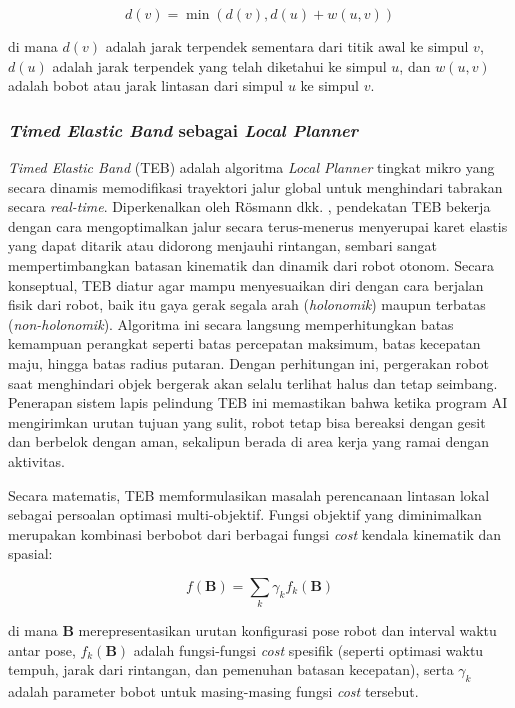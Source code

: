 \begin{equation}
d(v) = \min(d(v), d(u) + w(u, v))
\label{eq:dijkstra}
\end{equation}

di mana $d(v)$ adalah jarak terpendek sementara dari titik awal ke simpul $v$, $d(u)$ adalah jarak terpendek yang telah diketahui ke simpul $u$, dan $w(u, v)$ adalah bobot atau jarak lintasan dari simpul $u$ ke simpul $v$.

\subsubsection{\textit{Timed Elastic Band} sebagai \textit{Local Planner}}
\textit{Timed Elastic Band} (TEB) adalah algoritma \textit{Local Planner} tingkat mikro yang secara dinamis memodifikasi trayektori jalur global untuk menghindari tabrakan secara \textit{real-time}. Diperkenalkan oleh R{\"o}smann dkk. \cite{rosmann2012trajectory}, pendekatan TEB bekerja dengan cara mengoptimalkan jalur secara terus-menerus menyerupai karet elastis yang dapat ditarik atau didorong menjauhi rintangan, sembari sangat mempertimbangkan batasan kinematik dan dinamik dari robot otonom. Secara konseptual, TEB diatur agar mampu menyesuaikan diri dengan cara berjalan fisik dari robot, baik itu gaya gerak segala arah (\textit{holonomik}) maupun terbatas (\textit{non-holonomik}). Algoritma ini secara langsung memperhitungkan batas kemampuan perangkat seperti batas percepatan maksimum, batas kecepatan maju, hingga batas radius putaran. Dengan perhitungan ini, pergerakan robot saat menghindari objek bergerak akan selalu terlihat halus dan tetap seimbang. Penerapan sistem lapis pelindung TEB ini memastikan bahwa ketika program AI mengirimkan urutan tujuan yang sulit, robot tetap bisa bereaksi dengan gesit dan berbelok dengan aman, sekalipun berada di area kerja yang ramai dengan aktivitas.

Secara matematis, TEB memformulasikan masalah perencanaan lintasan lokal sebagai persoalan optimasi multi-objektif. Fungsi objektif yang diminimalkan merupakan kombinasi berbobot dari berbagai fungsi \textit{cost} kendala kinematik dan spasial:

\begin{equation}
f(\mathbf{B}) = \sum_{k} \gamma_k f_k(\mathbf{B})
\label{eq:teb_objective}
\end{equation}

di mana $\mathbf{B}$ merepresentasikan urutan konfigurasi pose robot dan interval waktu antar pose, $f_k(\mathbf{B})$ adalah fungsi-fungsi \textit{cost} spesifik (seperti optimasi waktu tempuh, jarak dari rintangan, dan pemenuhan batasan kecepatan), serta $\gamma_k$ adalah parameter bobot untuk masing-masing fungsi \textit{cost} tersebut.

